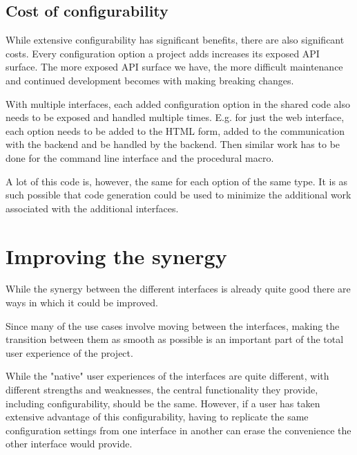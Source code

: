 
\subsection{Cost of configurability}

While extensive configurability has significant benefits, there are also significant costs. Every configuration option a project adds increases its exposed API surface. The more exposed API surface we have, the more difficult maintenance and continued development becomes with making breaking changes.

With multiple interfaces, each added configuration option in the shared code also needs to be exposed and handled multiple times. E.g. for just the web interface, each option needs to be added to the HTML form, added to the communication with the backend and be handled by the backend. Then similar work has to be done for the command line interface and the procedural macro.

A lot of this code is, however, the same for each option of the same type. It is as such possible that code generation could be used to minimize the additional work associated with the additional interfaces.



\section{Improving the synergy}
\label{sec:improving-synergy}

While the synergy between the different interfaces is already quite good there are ways in which it could be improved.

Since many of the use cases involve moving between the interfaces, making the transition between them as smooth as possible is an important part of the total user experience of the project.

While the "native" user experiences of the interfaces are quite different, with different strengths and weaknesses, the central functionality they provide, including configurability, should be the same. However, if a user has taken extensive advantage of this configurability, having to replicate the same configuration settings from one interface in another can erase the convenience the other interface would provide.


